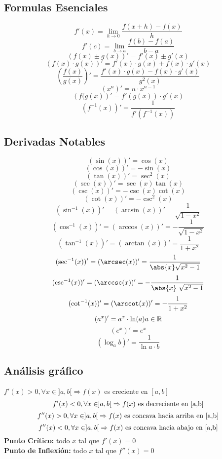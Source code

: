 \headingFormulaSheet

\subsection*{Formulas Esenciales}
%
\[ f'(x)=\lim_{h \to 0}\frac{f(x+h)-f(x)}{h}\]
\[ f'(c)=\lim_{b\to a}\frac{f(b)-f(a)}{b-a}\]
\[(f(x)\pm g(x))'=f'(x)\pm g'(x) \]
\[ (f(x) \cdot g(x))'=f'(x) \cdot g(x) + f(x) \cdot g'(x)\]
\[ \left(\frac{f(x)}{g(x)}\right)'= \frac{f'(x)\cdot g(x)-f(x)\cdot g'(x)}{g^{2}(x)}
\]
\[\left(x^{n} \right)'= n\cdot x^{n-1}\]
\[ \left(f(g(x)\right)'=f'(g(x))\cdot g'(x)\]
\[\left(f^{-1}(x)\right)'=\frac{1}{f'(f^{-1}(x))}\]

\subsection*{Derivadas Notables}
\[ (\sin(x))'=\cos(x) \]
\[(\cos(x))'=-\sin(x) \]
\[ (\tan(x))'=\sec^{2}(x) \]
\[(\sec(x))'=\sec(x)\tan(x)\]
\[ (\csc(x))'=-\csc(x)\cot(x)\]
\[ (\cot(x))'=-\csc^{2}(x) \]
\[ (\sin^{-1}(x))'=(\arcsin(x))'=\frac{1}{\sqrt{1-x^{2}}} \]
\[(\cos^{-1}(x))'=(\arccos(x))'=-\frac{1}{\sqrt{1-x^{2}}}\]
\[(\tan^{-1}(x))'=(\arctan(x))'=\frac{1}{1+x^{2}}\]
\[(\sec^{-1}(x))'=(\arcsec(x))'=\frac{1}{\abs{x} \sqrt{x^2-1}}\]
\[(\csc^{-1}(x))'=(\arccsc(x))'=-\frac{1}{\abs{x}\ \sqrt{x^2-1}}\]
\[(\cot^{-1}(x))'=(\arccot(x))'=-\frac{1}{1+x^{2}}\]
\[(a^{x})'=a^{x} \cdot \ln(a) \\ a\in \mathbb{R}\]
\[(e^{x})' = e^{x}\]
\[(\log_{a}{b})'=\frac{1}{\ln{a} \cdot b}\]

\subsection*{Análisis gráfico}
$f'(x)>0, \forall x\in ]a,b[ \Rightarrow f(x)$ es creciente en $[a,b]$
\[f'(x)<0 ,\\ \forall x\in ]a,b[\\ \Rightarrow f(x)\\ \mbox{ es decreciente en [a,b]}  \]
\[f''(x)>0, \forall x\in ]a,b[ \\ \Rightarrow f(x) \mbox{ es concava hacia arriba en [a,b]}\]
\[f''(x)<0, \forall x\in ]a,b[ \\ \Rightarrow f(x) \mbox{ es concava hacia abajo en [a,b]} \]
\textbf{Punto Crítico:} todo $x$ tal que $f'(x)=0$\\
\textbf{Punto de Inflexión:} todo $x$ tal que $f''(x)=0$

